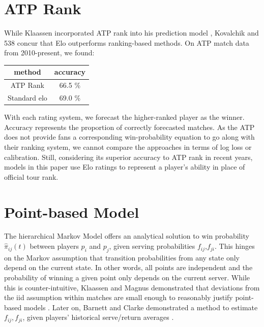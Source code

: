 \documentclass[chapterprefix=false]{report}
\begin{document}
\section{ATP Rank}
While Klaassen incorporated ATP rank into his prediction model \cite{Klaassen2003}, Kovalchik and 538 concur that Elo outperforms ranking-based methods. On ATP match data from 2010-present, we found:

\begin{center}
\begin{tabular}{ |c|c| } 
 \hline
 method & accuracy
   \\ 
 \hline
  ATP Rank & 66.5 \%
  \\ 
 \hline
  Standard elo & 69.0 \%
  \\ 
 \hline
\end{tabular}
\end{center}

With each rating system, we forecast the higher-ranked player as the winner. Accuracy represents the proportion of correctly forecasted matches. As the ATP does not provide fans a corresponding win-probability equation to go along with their ranking system, we cannot compare the approaches in terms of log loss or calibration. Still, considering its superior accuracy to ATP rank in recent years, models in this paper use Elo ratings to represent a player's ability in place of official tour rank.

\section{Point-based Model}
The hierarchical Markov Model offers an analytical solution to win probability $\hat{\pi}_{ij}(t)$ between players $p_i$ and $p_j$, given serving probabilities $f_{ij}$,$f_{ji}$. This hinges on the Markov assumption that transition probabilities from any state only depend on the current state. In other words, all points are independent and the probability of winning a given point only depends on the current server. While this is counter-intuitive, Klaassen and Magnus demonstrated that deviations from the iid assumption within matches are small enough to reasonably justify point-based models \cite{KlaassenandMagnus2001}. Later on, Barnett and Clarke demonstrated a method to estimate $f_{ij},f_{ji}$, given players' historical serve/return averages \cite{BarnettandClarke2005}.

\end{document}
